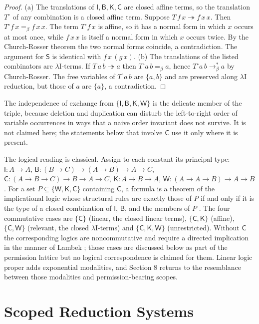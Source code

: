 \documentclass[11pt]{article}
\theoremstyle{definition}
\theoremstyle{remark}
\newcommand{\cI}{\mathsf{I}}
\newcommand{\cB}{\mathsf{B}}
\newcommand{\cC}{\mathsf{C}}
\newcommand{\cK}{\mathsf{K}}
\newcommand{\cW}{\mathsf{W}}
\newcommand{\cS}{\mathsf{S}}
\newcommand{\red}{\twoheadrightarrow}
\begin{document}
\begin{proof}
(a) The translations of $\cI,\cB,\cK,\cC$ are closed affine terms, so the translation $T^\circ$ of any combination is a closed affine term. Suppose $T\,f\,x\red f\,x\,x$. Then $T^\circ f\,x=_\beta f\,x\,x$. The term $T^\circ f\,x$ is affine, so it has a normal form in which $x$ occurs at most once, while $f\,x\,x$ is itself a normal form in which $x$ occurs twice. By the Church-Rosser theorem the two normal forms coincide, a contradiction. The argument for $\cS$ is identical with $f\,x\,(g\,x)$. (b) The translations of the listed combinators are $\lambda\mathrm{I}$-terms. If $T\,a\,b\red a$ then $T^\circ a\,b=_\beta a$, hence $T^\circ a\,b\to_\beta^{*}a$ by Church-Rosser. The free variables of $T^\circ a\,b$ are $\{a,b\}$ and are preserved along $\lambda\mathrm{I}$ reduction, but those of $a$ are $\{a\}$, a contradiction.
\end{proof}

The independence of exchange from $\{\cI,\cB,\cK,\cW\}$ is the delicate member of the triple, because deletion and duplication can disturb the left-to-right order of variable occurrences in ways that a naive order invariant does not survive. It is not claimed here; the statements below that involve $\cC$ use it only where it is present.

The logical reading is classical. Assign to each constant its principal type: $\cI:A\to A$, $\cB:(B\to C)\to(A\to B)\to A\to C$, $\cC:(A\to B\to C)\to B\to A\to C$, $\cK:A\to B\to A$, $\cW:(A\to A\to B)\to A\to B$. For a set $P\subseteq\{\cW,\cK,\cC\}$ containing $\cC$, a formula is a theorem of the implicational logic whose structural rules are exactly those of $P$ if and only if it is the type of a closed combination of $\cI$, $\cB$, and the members of $P$ \citep{curryfeys1958,hindleyseldin2008}. The four commutative cases are $\{\cC\}$ (linear, the closed linear terms), $\{\cC,\cK\}$ (affine), $\{\cC,\cW\}$ (relevant, the closed $\lambda\mathrm{I}$-terms) and $\{\cC,\cK,\cW\}$ (unrestricted). Without $\cC$ the corresponding logics are noncommutative and require a directed implication in the manner of Lambek \citep{lambek1958}; those cases are discussed below as part of the permission lattice but no logical correspondence is claimed for them. Linear logic proper \citep{girard1987} adds exponential modalities, and Section 8 returns to the resemblance between those modalities and permission-bearing scopes.

\section{Scoped Reduction Systems}
\end{document}
